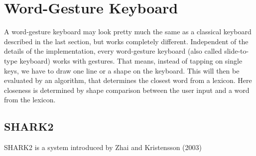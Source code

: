 \section{Word-Gesture Keyboard}
A word-gesture keyboard may look pretty much the same as a classical keyboard described in the last section, but works completely different. Independent of the details of the implementation, every word-gesture keyboard (also called slide-to-type keyboard) works with gestures. That means, instead of tapping on single keys, we have to draw one line or a shape on the keyboard. This will then be evaluated by an algorithm, that determines the closest word from a lexicon. Here closeness is determined by shape comparison between the user input and a word from the lexicon. 

\subsection{SHARK2}
SHARK2 is a system introduced by Zhai and Kristensson (2003) 
